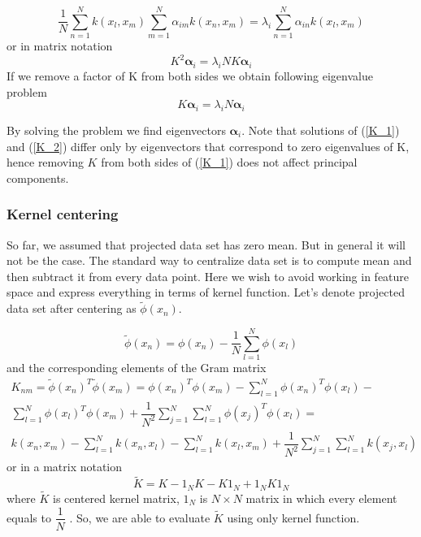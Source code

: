 \begin{equation}
\dfrac{1}{N}\sum_{n=1}^{N}{k(x_l, x_m)} \sum_{m=1}^{N}{\alpha_{im}k(x_n, x_m)} = \lambda_i \sum_{n=1}^{N}{\alpha_{in}k(x_l, x_m)}
\end{equation}
or in matrix notation
\begin{equation}\label{K_1}
K^2 \bm{\alpha}_i = \lambda_i N K \bm{\alpha}_i
\end{equation}
If we remove a factor of K from both sides we obtain following eigenvalue problem
\begin{equation}\label{K_2}
K \bm{\alpha}_i = \lambda_i N \bm{\alpha}_i
\end{equation}

By solving the problem we find eigenvectors $\bm{\alpha}_i$. Note that solutions of (\ref{K_1}) and (\ref{K_2}) differ only by eigenvectors that correspond to zero eigenvalues of K, hence removing $K$ from both sides of (\ref{K_1}) does not affect principal components.  

\subsubsection{Kernel centering}
So far, we assumed that projected data set has zero mean. But in general it will not be the case. The standard way to centralize data set is to compute mean and then subtract it from every data point.
Here we wish to avoid working in feature space and express everything in terms of kernel function. Let's denote projected data set after centering as $\widetilde{\phi}(x_n)$.

\begin{equation}
\widetilde{\phi}(x_n) = \phi(x_n) - \frac{1}{N}\sum_{l=1}^{N} \phi(x_l)
\end{equation}
and the corresponding elements of the Gram matrix
\begin{equation}
\begin{aligned}
K_{nm} = \widetilde{\phi}(x_n)^T\widetilde{\phi}(x_m) = 
\phi(x_n)^T\phi(x_m) -
\sum_{l=1}^{N}{\phi(x_n)^T\phi(x_l)} - \\ \sum_{l=1}^{N}{\phi(x_l)^T\phi(x_m)} +  \dfrac{1}{N^2}\sum_{j=1}^{N}\sum_{l=1}^{N}{\phi(x_j)^T\phi(x_l)} = \\
k(x_n, x_m) - \sum_{l=1}^{N}{k(x_n, x_l)} - \sum_{l=1}^{N}{k(x_l, x_m)} + \dfrac{1}{N^2}\sum_{j=1}^{N}\sum_{l=1}^{N}{k(x_j, x_l)}
\end{aligned}
\end{equation}
or in a matrix notation
\begin{equation}
\widetilde{K} = K - 1_NK - K1_N + 1_NK1_N
\end{equation}
where $\widetilde{K}$ is centered kernel matrix, $1_N$ is $N \times N$ matrix in which every element equals to $\dfrac{1}{N}$ \citep{bishop}.
So, we are able to evaluate $\widetilde{K}$ using only kernel function.
